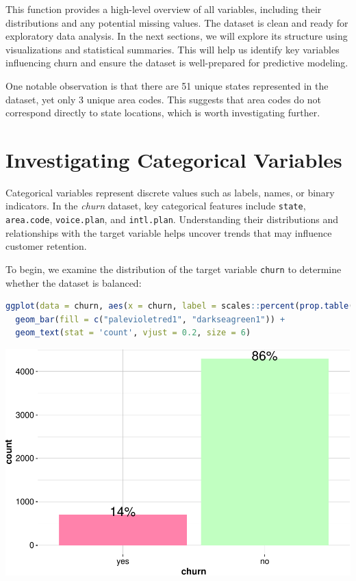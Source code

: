 \documentclass[
]{book}
\newcommand{\passthrough}[1]{#1}
\theoremstyle{definition}
\theoremstyle{definition}
\theoremstyle{definition}
\theoremstyle{definition}
\theoremstyle{remark}
\begin{document}
This function provides a high-level overview of all variables, including their distributions and any potential missing values. The dataset is clean and ready for exploratory data analysis. In the next sections, we will explore its structure using visualizations and statistical summaries. This will help us identify key variables influencing churn and ensure the dataset is well-prepared for predictive modeling.

One notable observation is that there are 51 unique states represented in the dataset, yet only 3 unique area codes. This suggests that area codes do not correspond directly to state locations, which is worth investigating further.

\section{Investigating Categorical Variables}\label{chapter-EDA-categorical}

Categorical variables represent discrete values such as labels, names, or binary indicators. In the \emph{churn} dataset, key categorical features include \passthrough{\lstinline!state!}, \passthrough{\lstinline!area.code!}, \passthrough{\lstinline!voice.plan!}, and \passthrough{\lstinline!intl.plan!}. Understanding their distributions and relationships with the target variable helps uncover trends that may influence customer retention.

To begin, we examine the distribution of the target variable \passthrough{\lstinline!churn!} to determine whether the dataset is balanced:

\begin{lstlisting}[language=R]
ggplot(data = churn, aes(x = churn, label = scales::percent(prop.table(stat(count))))) +
  geom_bar(fill = c("palevioletred1", "darkseagreen1")) + 
  geom_text(stat = 'count', vjust = 0.2, size = 6)
\end{lstlisting}

\begin{center}\includegraphics[width=0.7\linewidth]{EDA_files/figure-latex/unnamed-chunk-4-1} \end{center}
\end{document}
